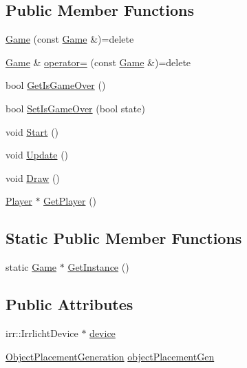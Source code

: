 \subsection*{Public Member Functions}
\begin{DoxyCompactItemize}
\item 
\hyperlink{class_game_abb28875d74d25fa9e0dcdbe37c6ad89c}{Game} (const \hyperlink{class_game}{Game} \&)=delete
\item 
\hyperlink{class_game}{Game} \& \hyperlink{class_game_a4d0c0503733cc50b0b5cb8d7ef1237ec}{operator=} (const \hyperlink{class_game}{Game} \&)=delete
\item 
bool \hyperlink{class_game_a472e76af50d5275142522f9a5e149ab1}{Get\-Is\-Game\-Over} ()
\item 
bool \hyperlink{class_game_acd4aa68f7ef7603ecd61a879fe0286e7}{Set\-Is\-Game\-Over} (bool state)
\item 
void \hyperlink{class_game_adb05b20574551a26f8cf1dc664782790}{Start} ()
\item 
void \hyperlink{class_game_a1c5373c68261c54aff03e6abe40fee52}{Update} ()
\item 
void \hyperlink{class_game_aad2c20e2c5529244095c50c238911e30}{Draw} ()
\item 
\hyperlink{class_player}{Player} $\ast$ \hyperlink{class_game_ae09ac6fe3bf0d17657cd315e639f8fa4}{Get\-Player} ()
\end{DoxyCompactItemize}
\subsection*{Static Public Member Functions}
\begin{DoxyCompactItemize}
\item 
static \hyperlink{class_game}{Game} $\ast$ \hyperlink{class_game_aa989d3cee96d5ae093663bf62dea57e2}{Get\-Instance} ()
\end{DoxyCompactItemize}
\subsection*{Public Attributes}
\begin{DoxyCompactItemize}
\item 
irr\-::\-Irrlicht\-Device $\ast$ \hyperlink{class_game_a4968552e2ba3037d494596a908eccc00}{device}
\item 
\hyperlink{class_object_placement_generation}{Object\-Placement\-Generation} \hyperlink{class_game_a582b0adfa98534d79ec9511919827029}{object\-Placement\-Gen}
\end{DoxyCompactItemize}
